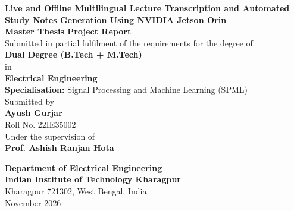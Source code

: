 \documentclass[11pt,a4paper,oneside]{report}
\begin{document}
\begin{titlepage}
\begin{center}
    \vspace*{0.5cm}
    
    {\huge \bfseries \color{primarydark} Live and Offline Multilingual Lecture Transcription and Automated Study Notes Generation Using NVIDIA Jetson Orin}\\[1.2cm]
    
    {\large \bfseries Master Thesis Project Report}\\[0.3cm]
    {\normalsize Submitted in partial fulfilment of the requirements for the degree of}\\[0.3cm]
    {\Large \bfseries Dual Degree (B.Tech + M.Tech)}\\[0.2cm]
    {\normalsize in}\\[0.2cm]
    {\Large \bfseries Electrical Engineering}\\[0.3cm]
    {\large \textbf{Specialisation:} Signal Processing and Machine Learning (SPML)}\\[1.2cm]
    
    {\large Submitted by}\\[0.3cm]
    {\LARGE \bfseries \color{accentblue} Ayush Gurjar}\\[0.2cm]
    {\large Roll No. 22IE35002}\\[1.0cm]
    
    {\large Under the supervision of}\\[0.3cm]
    {\Large \bfseries \color{primarydark} Prof. Ashish Ranjan Hota}\\[1.5cm]
    
    \begin{figure}[h]
    \centering
    \end{figure}
    
    \vfill
    
    {\large \bfseries Department of Electrical Engineering}\\[0.2cm]
    {\large \bfseries Indian Institute of Technology Kharagpur}\\[0.2cm]
    {\normalsize Kharagpur 721302, West Bengal, India}\\[0.2cm]
    {\normalsize November 2026}
    
\end{center}
\end{titlepage}
\end{document}
